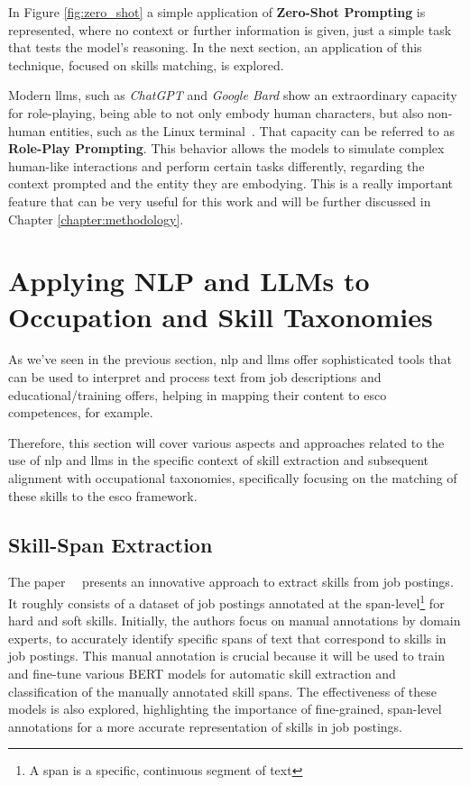 In Figure \ref{fig:zero_shot} a simple application of \textbf{Zero-Shot Prompting} is represented, where no context or further information is given, just a simple task that tests the model’s reasoning. In the next section, an application of this technique, focused on skills matching, is explored.

Modern \ac{llms}, such as \textit{ChatGPT} and \textit{Google Bard} show an extraordinary capacity for role-playing, being able to not only embody human characters, but also non-human entities, such as the Linux terminal~\cite{kong2023better}. That capacity can be referred to as \textbf{Role-Play Prompting}. This behavior allows the models to simulate complex human-like interactions and perform certain tasks differently, regarding the context prompted and the entity they are embodying. This is a really important feature that can be very useful for this work and will be further discussed in Chapter \ref{chapter:methodology}.

\section{Applying NLP and LLMs to Occupation and Skill Taxonomies}
\label{sec:applying}
As we’ve seen in the previous section, \ac{nlp} and \ac{llms} offer sophisticated tools that can be used to interpret and process text from job descriptions and educational/training offers, helping in mapping their content to \ac{esco} competences, for example.

Therefore, this section will cover various aspects and approaches related to the use of \ac{nlp} and \ac{llms} in the specific context of skill extraction and subsequent alignment with occupational taxonomies, specifically focusing on the matching of these skills to the \ac{esco} framework.


\subsection{Skill-Span Extraction}
\label{sec:skillspan}
The paper~~\cite{zhang2022skillspan} presents an innovative approach to extract skills from job postings. It roughly consists of a dataset of job postings annotated at the span-level\footnote{A span is a specific, continuous segment of text} for hard and soft skills. Initially, the authors focus on manual annotations by domain experts, to accurately identify specific spans of text that correspond to skills in job postings. This manual annotation is crucial because it will be used to train and fine-tune various BERT models for automatic skill extraction and classification of the manually annotated skill spans. The effectiveness of these models is also explored, highlighting the importance of fine-grained, span-level annotations for a more accurate representation of skills in job postings.

